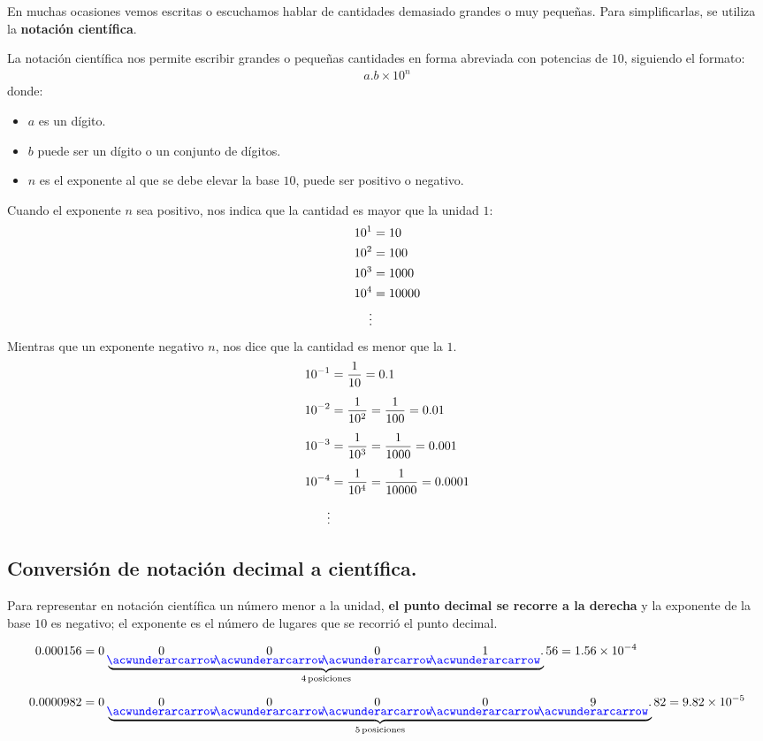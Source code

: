 \documentclass[14pt]{extarticle}
\newcommand{\textocolor}[2]{\textbf{\textcolor{#1}{#2}}}
\newcommand\deci[1]{%
    \kern-.4ex\stackunder[0.4pt]{$#1$}{$\color{blue}\acwunderarcarrow$}
}
\begin{document}
En muchas ocasiones vemos escritas o escuchamos hablar de cantidades demasiado grandes o muy pequeñas. Para simplificarlas, se utiliza la \textbf{notación científica}. 
\par
La notación científica nos permite escribir grandes o pequeñas cantidades en forma abreviada con potencias de $10$, siguiendo el formato:
\begin{align*}
a.b \times 10^{n}
\end{align*}
donde:
\begin{itemize}
\item $a$ es un dígito.
\item $b$ puede ser un dígito o un conjunto de dígitos.
\item $n$ es el exponente al que se debe elevar la base $10$, puede ser positivo o negativo.
\end{itemize}
Cuando el exponente $n$ sea positivo, nos indica que la cantidad es mayor que la unidad $1$:
\begin{align*}
\num{d1} &= 10 \\
\num{d2} &= 100 \\
\num{d3} &= 1000 \\
\num{d4} &= 10000 \\
\vdots
\end{align*}
Mientras que un exponente negativo $n$, nos dice que la cantidad es menor que la $1$.
\begin{align*}
\num{d-1} &= \dfrac{1}{10} = 0.1 \\[0.5em]
\num{d-2} &= \dfrac{1}{10^{2}} = \dfrac{1}{100} = 0.01 \\[0.5em]
\num{d-3} &= \dfrac{1}{10^{3}} = \dfrac{1}{1000} = 0.001 \\[0.5em]
\num{d-4} &= \dfrac{1}{10^{4}} = \dfrac{1}{10000} = 0.0001 \\[0.5em]
\vdots
\end{align*}

\subsection{Conversión de notación decimal a científica.}

Para representar en notación científica un número menor a la unidad, \textocolor{ao}{el punto decimal se recorre a la derecha} y la exponente de la base $10$ es negativo; el exponente es el número de lugares que se recorrió el punto decimal.

\begin{align*}
0.000156 &= 0 \, \underbrace{\deci{0} \deci{0} \deci{0} \deci{1}.}_{4 \, \text{posiciones}} 56 = \num{1.56d-4} \\[0.5em]
0.0000982 &= 0 \, \underbrace{\deci{0} \deci{0} \deci{0} \deci{0} \deci{9}.}_{5 \, \text{posiciones}} 82 = \num{9.82d-5}
\end{align*}
\end{document}
